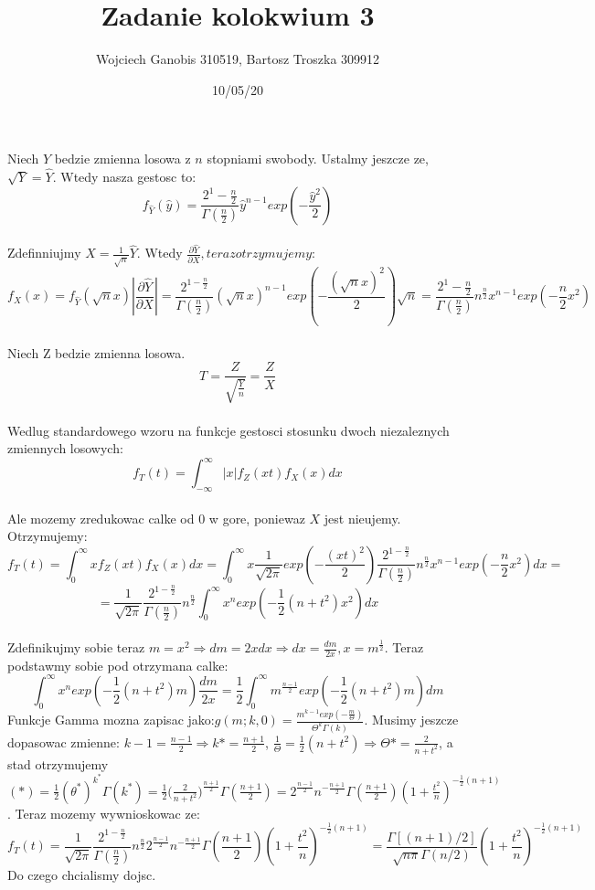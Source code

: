 \documentclass[12pt]{article}
\title{Zadanie kolokwium 3}
\author{Wojciech Ganobis 310519, Bartosz Troszka 309912}
\date{10/05/20}
\begin{document}
\maketitle
Niech $Y$ bedzie zmienna losowa z $n$ stopniami swobody. Ustalmy jeszcze ze, $\sqrt{Y} = \hat{Y}$. Wtedy nasza gestosc to:
$$f_{\hat{Y}}(\hat{y}) = \frac{2^{1}-\frac{n}{2}}{\Gamma (\frac{n}{2})}\hat{y}^{n-1} exp( - \frac{\hat{y}^{2}}{2} )$$
\\
Zdefinniujmy $X = \frac{1}{\sqrt{n}}\hat{Y}$. Wtedy $\frac{\partial \hat{Y}}{\partial X}, teraz otrzymujemy:$
$$f_{X}(x) = f_{\hat{Y}}(\sqrt{n}x)|\frac{\partial \hat{Y}}{\partial X}| =  \frac{2^{1-\frac{n}{2}}}{\Gamma (\frac{n}{2})} (\sqrt{n}x)^{n-1} exp(-\frac{(\sqrt{n}x)^{2}}{2})\sqrt{n} = \frac{2^{1}-\frac{n}{2}}{\Gamma (\frac{n}{2})} n^{\frac{n}{2}}x^{n-1} exp(-\frac{n}{2}x^{2})$$
\\
Niech Z bedzie zmienna losowa.
$$ T = \frac{Z}{\sqrt{\frac{Y}{n}}} = \frac{Z}{X} $$
\\
Wedlug standardowego wzoru na funkcje gestosci stosunku dwoch niezaleznych zmiennych losowych:
$$ f_{T}(t) = \int_{-\infty}^{\infty} |x|f_{Z}(xt)f_{X}(x)dx $$
\\
Ale mozemy zredukowac calke od 0 w gore, poniewaz $X$ jest nieujemy. Otrzymujemy:
$$ f_{T}(t) = \int_{0}^{\infty} xf_{Z}(xt)f_{X}(x)dx = \int_{0}^{\infty} x\frac{1}{\sqrt{2\pi}}exp(-\frac{(xt)^{2}}{2})\frac{2^{1-\frac{n}{2}}}{\Gamma(\frac{n}{2})}n^{\frac{n}{2}}x^{n-1}exp(-\frac{n}{2}x^{2})dx =$$$$= \frac{1}{\sqrt{2\pi}}\frac{2^{1-\frac{n}{2}}}{\Gamma(\frac{n}{2})}n^{\frac{n}{2}}\int_{0}^{\infty} x^{n}exp(-\frac{1}{2}(n+t^{2})x^{2})dx $$
\\
Zdefinikujmy sobie teraz $m = x^{2} \Rightarrow dm = 2xdx \Rightarrow dx = \frac{dm}{2x}, x = m^{\frac{1}{2}} $. Teraz podstawmy sobie pod otrzymana calke:
$$\int_{0}^{\infty}x^{n}exp(-\frac{1}{2}(n+t^{2})m)\frac{dm}{2x} = \frac{1}{2}\int^{\infty}_{0}m^{\frac{n-1}{2}}exp(-\frac{1}{2}(n+t^{2})m)dm$$
Funkcje Gamma mozna zapisac jako:$ g(m; k,0) = \frac{m^{k-1}exp(-\frac{m}{\Theta})}{\Theta^{k}\Gamma(k)}$. Musimy jeszcze dopasowac zmienne: $k-1 = \frac{n-1}{2} \Rightarrow k*=\frac{n+1}{2}$, $\frac{1}{\Theta} = \frac{1}{2}(n+t^{2}) \Rightarrow \Theta * = \frac{2}{n+t^{2}}$, a stad otrzymujemy $(*) = \frac12(\theta^*)^{k^*}\Gamma(k^*) = \frac12 \Big (\frac 2 {n+t^2}\Big )^{\frac {n+1}{2}}\Gamma\left(\frac {n+1}{2}\right) = 2^{\frac {n-1}{2}}n^{-\frac {n+1}{2}}\Gamma\left(\frac {n+1}{2}\right)\left(1+\frac {t^2}{n}\right)^{-\frac 12 (n+1)}$. Teraz mozemy wywnioskowac ze:
$$f_T(t) = \frac{1}{\sqrt{2\pi}}\frac {2^{1-\frac n2}}{\Gamma\left(\frac{n}{2}\right)} n^{\frac n2}2^{\frac {n-1}{2}}n^{-\frac {n+1}{2}}\Gamma\left(\frac {n+1}{2}\right)\left(1+\frac {t^2}{n}\right)^{-\frac 12 (n+1)}=\frac{\Gamma[(n+1)/2]}{\sqrt{n\pi}\Gamma(n/2)}\left(1+\frac {t^2}{n}\right)^{-\frac 12 (n+1)}$$
Do czego chcialismy dojsc.
\end{document}
